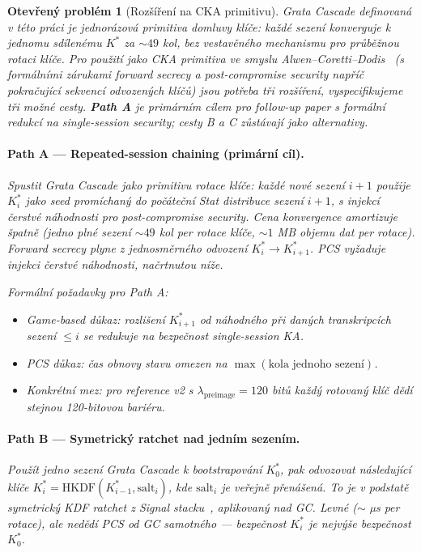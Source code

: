 \documentclass[11pt,a4paper]{article}
\newtheorem{openproblem}{Otev\v{r}en\'y probl\'em}
\begin{document}
\begin{openproblem}[Rozšíření na CKA primitivu]\label{prob:cka-extension}
Grata Cascade definovaná v této práci je \emph{jednorázová} primitiva domluvy klíče: každé sezení konverguje k jednomu sdílenému $K^*$ za $\sim 49$ kol, bez vestavěného mechanismu pro průběžnou rotaci klíče. Pro použití jako CKA primitiva ve smyslu Alwen--Coretti--Dodis~\cite{ACD19} (s formálními zárukami forward secrecy a post-compromise security napříč pokračující sekvencí odvozených klíčů) jsou potřeba tři rozšíření, vyspecifikujeme tři možné cesty. \textbf{Path A} je primárním cílem pro follow-up paper s formální redukcí na single-session security; cesty B a C zůstávají jako alternativy.

\paragraph{Path A --- Repeated-session chaining (primární cíl).}
Spustit Grata Cascade jako primitivu rotace klíče: každé nové sezení $i+1$ použije $K^*_i$ jako seed promíchaný do počáteční Stat distribuce sezení $i+1$, s injekcí čerstvé náhodnosti pro post-compromise security. Cena konvergence amortizuje špatně (jedno plné sezení $\sim 49$ kol per rotace klíče, $\sim 1$ MB objemu dat per rotace). Forward secrecy plyne z jednosměrného odvození $K^*_i \to K^*_{i+1}$. PCS vyžaduje injekci čerstvé náhodnosti, načrtnutou níže.

\emph{Formální požadavky pro Path A:}
\begin{itemize}[leftmargin=*]
\item Game-based důkaz: rozlišení $K^*_{i+1}$ od náhodného při daných transkripcích sezení $\leq i$ se redukuje na bezpečnost single-session KA.
\item PCS důkaz: čas obnovy stavu omezen na $\max(\text{kola jednoho sezení})$.
\item Konkrétní mez: pro reference v2 s $\lambda_\text{preimage} = 120$ bitů každý rotovaný klíč dědí stejnou 120-bitovou bariéru.
\end{itemize}

\paragraph{Path B --- Symetrický ratchet nad jedním sezením.}
Použít jedno sezení Grata Cascade k bootstrapování $K^*_0$, pak odvozovat následující klíče $K^*_i = \mathrm{HKDF}(K^*_{i-1}, \mathrm{salt}_i)$, kde $\mathrm{salt}_i$ je veřejně přenášená. To je v podstatě symetrický KDF ratchet z Signal stacku~\cite{DR2017}, aplikovaný nad GC. Levné ($\sim$ µs per rotace), ale \emph{nedědí} PCS od GC samotného --- bezpečnost $K^*_i$ je nejvýše bezpečnost $K^*_0$.


\end{openproblem}
\end{document}
